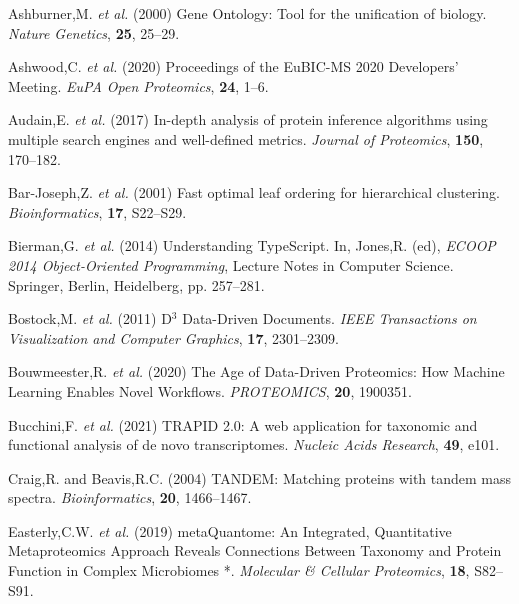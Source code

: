 \hypertarget{refs}{}
\begin{CSLReferences}{1}{0}
\leavevmode\hypertarget{ref-ashburnerGeneOntologyTool2000}{}%
Ashburner,M. \emph{et al.} (2000) Gene {Ontology}: Tool for the
unification of biology. \emph{Nature Genetics}, \textbf{25}, 25--29.

\leavevmode\hypertarget{ref-ashwoodProceedingsEuBICMS20202020}{}%
Ashwood,C. \emph{et al.} (2020) Proceedings of the {EuBIC-MS} 2020
{Developers}' {Meeting}. \emph{EuPA Open Proteomics}, \textbf{24}, 1--6.

\leavevmode\hypertarget{ref-audainIndepthAnalysisProtein2017}{}%
Audain,E. \emph{et al.} (2017) In-depth analysis of protein inference
algorithms using multiple search engines and well-defined metrics.
\emph{Journal of Proteomics}, \textbf{150}, 170--182.

\leavevmode\hypertarget{ref-bar-josephFastOptimalLeaf2001}{}%
Bar-Joseph,Z. \emph{et al.} (2001) Fast optimal leaf ordering for
hierarchical clustering. \emph{Bioinformatics}, \textbf{17}, S22--S29.

\leavevmode\hypertarget{ref-biermanUnderstandingTypeScript2014}{}%
Bierman,G. \emph{et al.} (2014) Understanding {TypeScript}. In, Jones,R.
(ed), \emph{{ECOOP} 2014 {} {Object-Oriented Programming}}, Lecture
{Notes} in {Computer Science}. {Springer}, {Berlin, Heidelberg}, pp.
257--281.

\leavevmode\hypertarget{ref-bostockDataDrivenDocuments2011}{}%
Bostock,M. \emph{et al.} (2011) {D}{\(^3\)} {Data-Driven Documents}.
\emph{IEEE Transactions on Visualization and Computer Graphics},
\textbf{17}, 2301--2309.

\leavevmode\hypertarget{ref-bouwmeesterAgeDataDrivenProteomics2020}{}%
Bouwmeester,R. \emph{et al.} (2020) The {Age} of {Data-Driven
Proteomics}: {How Machine Learning Enables Novel Workflows}.
\emph{PROTEOMICS}, \textbf{20}, 1900351.

\leavevmode\hypertarget{ref-bucchiniTRAPIDWebApplication2021}{}%
Bucchini,F. \emph{et al.} (2021) {TRAPID} 2.0: A web application for
taxonomic and functional analysis of de novo transcriptomes.
\emph{Nucleic Acids Research}, \textbf{49}, e101.

\leavevmode\hypertarget{ref-craigTANDEMMatchingProteins2004}{}%
Craig,R. and Beavis,R.C. (2004) {TANDEM}: Matching proteins with tandem
mass spectra. \emph{Bioinformatics}, \textbf{20}, 1466--1467.

\leavevmode\hypertarget{ref-easterlyMetaQuantomeIntegratedQuantitative2019}{}%
Easterly,C.W. \emph{et al.} (2019) {metaQuantome}: {An Integrated},
{Quantitative Metaproteomics Approach Reveals Connections Between
Taxonomy} and {Protein Function} in {Complex Microbiomes} *.
\emph{Molecular \& Cellular Proteomics}, \textbf{18}, S82--S91.


\end{CSLReferences}
